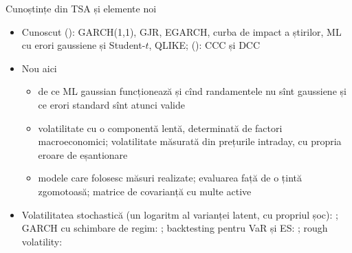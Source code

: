 \begin{frame}{Cunoștințe din TSA și elemente noi}
\itemsize{\small}
\begin{itemize}
    \item Cunoscut (): GARCH(1,1), GJR, EGARCH, curba de impact a știrilor, ML cu erori gaussiene și Student-$t$, QLIKE; (): CCC și DCC
    \item Nou aici
    \begin{itemize}
        \item de ce ML gaussian funcționează și cînd randamentele nu sînt gaussiene și ce erori standard sînt atunci valide
        \item volatilitate cu o componentă lentă, determinată de factori macroeconomici; volatilitate măsurată din prețurile intraday, cu propria eroare de eșantionare
        \item modele care folosesc măsuri realizate; evaluarea față de o țintă zgomotoasă; matrice de covarianță cu multe active
    \end{itemize}
    \item Volatilitatea stochastică (un logaritm al varianței latent, cu propriul șoc): ; GARCH cu schimbare de regim: ; backtesting pentru VaR și ES: ; rough volatility: 
\end{itemize}
\end{frame}

